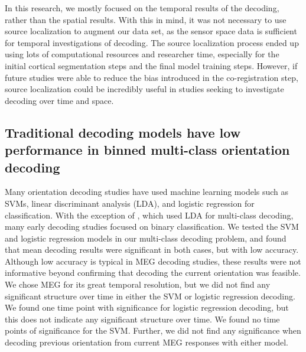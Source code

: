 \documentclass[../main.tex]{subfiles}
\begin{document}
In this research, we mostly focused on the temporal results of the decoding, rather than the spatial results. With this in mind, it was not necessary to use source localization to augment our data set, as the sensor space data is sufficient for temporal investigations of decoding. The source localization process ended up using lots of computational resources and researcher time, especially for the initial cortical segmentation steps and the final model training steps. However, if future studies were able to reduce the bias introduced in the co-registration step, source localization could be incredibly useful in studies seeking to investigate decoding over time and space.

\subsection*{Traditional decoding models have low performance in binned multi-class orientation decoding}
Many orientation decoding studies \citep{kamitani_tong_2005, haynes_rees_2005, cichy_ramirez_pantazis_2015} have used machine learning models such as SVMs, linear discriminant analysis (LDA), and logistic regression for classification. With the exception of \cite{kamitani_tong_2005}, which used LDA for multi-class decoding, many early decoding studies focused on binary classification. We tested the SVM and logistic regression models in our multi-class decoding problem, and found that mean decoding results were significant in both cases, but with low accuracy. Although low accuracy is typical in MEG decoding studies, these results were not informative beyond confirming that decoding the current orientation was feasible. We chose MEG for its great temporal resolution, but we did not find any significant structure over time in either the SVM or logistic regression decoding. We found one time point with significance for logistic regression decoding, but this does not indicate any significant structure over time. We found no time points of significance for the SVM. Further, we did not find any significance when decoding previous orientation from current MEG responses with either model. 
\end{document}
